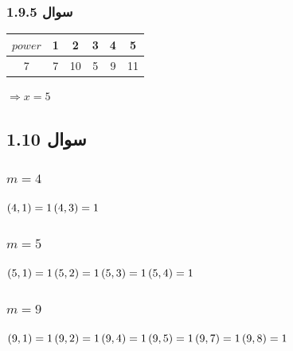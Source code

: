 \documentclass{article}
\begin{document}
\subsubsection{سوال 1.9.5}
\begin{latin}
\begin{table}[H]
\centering
\begin{tabular}{|c|c|c|c|c|c|}
\hline
$power$ & 1 & 2  & 3 & 4 & 5  \\ \hline
7   & 7 & 10 & 5 & 9 & 11 \\ \hline
\end{tabular}
\end{table}
\end{latin}
$\Rightarrow x = 5$

\subsection{سوال 1.10}

\subsubsection{$m = 4$}
$
\left( 4, 1 \right) = 1 \\
\left( 4, 3 \right) = 1 \\
$


\subsubsection{$m = 5$}
$
\left( 5, 1 \right) = 1 \\
\left( 5, 2 \right) = 1 \\
\left( 5, 3 \right) = 1 \\
\left( 5, 4 \right) = 1 \\
$


\subsubsection{$m = 9$}
$
\left( 9, 1 \right) = 1 \\
\left( 9, 2 \right) = 1 \\
\left( 9, 4 \right) = 1 \\
\left( 9, 5 \right) = 1 \\
\left( 9, 7 \right) = 1 \\
\left( 9, 8 \right) = 1 \\
$
\end{document}
